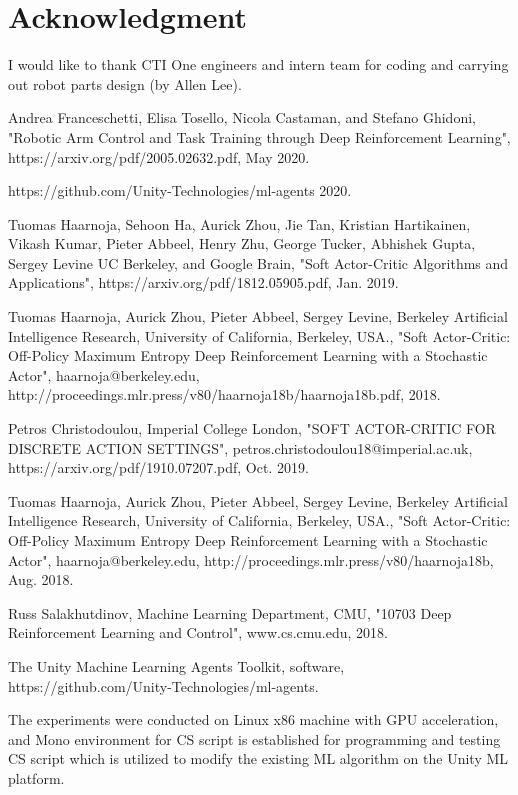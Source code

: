 \documentclass[conference]{IEEEtran}
\begin{document}
\section*{Acknowledgment}
I would like to thank CTI One engineers and 
intern team for coding and carrying out robot parts 
design (by Allen Lee). 

\begin{thebibliography}{1}
Andrea Franceschetti, Elisa Tosello, Nicola Castaman, and Stefano
Ghidoni, 
"Robotic Arm Control and Task Training
through Deep Reinforcement Learning", 
https://arxiv.org/pdf/2005.02632.pdf, May 2020. 
 

https://github.com/Unity-Technologies/ml-agents 2020. 

Tuomas Haarnoja, Sehoon Ha, Aurick Zhou, Jie Tan, Kristian Hartikainen, 
Vikash Kumar, Pieter Abbeel, Henry Zhu, George Tucker, Abhishek Gupta, Sergey 
Levine
UC Berkeley, and Google Brain, "Soft Actor-Critic Algorithms and Applications", 
https://arxiv.org/pdf/1812.05905.pdf, Jan. 2019. 

Tuomas Haarnoja, Aurick Zhou, Pieter Abbeel, Sergey Levine, 
Berkeley Artificial Intelligence Research, University of California, Berkeley, 
USA.,
"Soft Actor-Critic: Off-Policy Maximum Entropy Deep Reinforcement
Learning with a Stochastic Actor", 
haarnoja@berkeley.edu, 
http://proceedings.mlr.press/v80/haarnoja18b/haarnoja18b.pdf, 2018. 

 Petros Christodoulou, Imperial College London, 
"SOFT ACTOR-CRITIC FOR DISCRETE ACTION SETTINGS", 
petros.christodoulou18@imperial.ac.uk, https://arxiv.org/pdf/1910.07207.pdf, 
Oct. 2019.

Tuomas Haarnoja, Aurick Zhou, Pieter Abbeel, Sergey Levine, 
Berkeley Artificial Intelligence Research, University of California, Berkeley, USA.,
"Soft Actor-Critic:
Off-Policy Maximum Entropy Deep Reinforcement
Learning with a Stochastic Actor", 
haarnoja@berkeley.edu, 
http://proceedings.mlr.press/v80/haarnoja18b, 
Aug. 2018. 

Russ Salakhutdinov, Machine Learning Department, CMU,  
"10703 Deep Reinforcement Learning and Control", 
www.cs.cmu.edu, 2018. 

The Unity Machine Learning Agents Toolkit, software,  
https://github.com/Unity-Technologies/ml-agents. 

The experiments were conducted on Linux x86 machine with GPU
acceleration, and Mono environment for CS script is established
for programming and testing CS script which is utilized to 
modify the existing ML algorithm on the Unity ML platform. 


\end{thebibliography}
\end{document}
